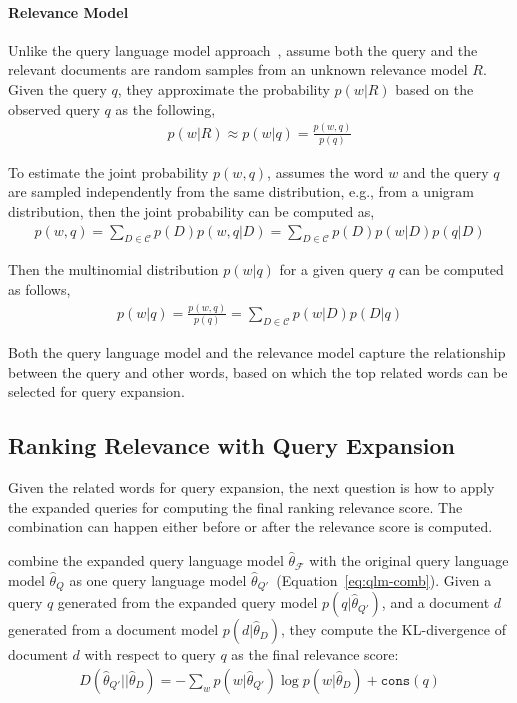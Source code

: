 \paragraph{Relevance Model}

Unlike the query language model approach~\citep{zhai-01b},
\cite{Lavrenko-2001} assume both the query and the relevant documents
are random samples from an unknown relevance model $R$. Given the
query $q$, they approximate the probability $p(w|R)$ based on the
observed query $q$ as the following,
\begin{align}
p(w|R) \approx p(w|q) = \frac{p(w,q)}{p(q)}
\end{align}

To estimate the joint probability $p(w,q)$, \cite{Lavrenko-2001}
assumes the word $w$ and the query $q$ are sampled independently from
the same distribution, e.g., from a unigram distribution, then the
joint probability can be computed as,
\begin{align}
p(w, q) = \sum_{D \in \mathcal{C}} p(D) p(w,q | D) = \sum_{D \in \mathcal{C}} p(D) p(w|D) p(q | D)
\end{align}

Then the multinomial distribution $p(w|q)$ for a given query $q$ can
be computed as follows,
\begin{align}
\label{eq:rm_qe}
p(w|q) = \frac{p(w, q)}{p(q)} = \sum_{D \in \mathcal{C}} p(w|D) p(D|q)
\end{align}

Both the query language model and the relevance model capture the
relationship between the query and other words, based on which the top
related words can be selected for query expansion.

\subsection{Ranking Relevance with Query Expansion}

Given the related words for query expansion, the next question is how
to apply the expanded queries for computing the final ranking
relevance score. The combination can happen either before or after the
relevance score is computed.

\cite{zhai-01b} combine the expanded query language model
$\hat{\theta}_{\mathcal{F}}$ with the original query language model
$\hat{\theta}_{Q}$ as one query language model $\hat{\theta}_{Q'}
$~(Equation~\ref{eq:qlm-comb}). Given a query $q$ generated from the
expanded query model $p(q|\hat{\theta}_{Q'})$, and a document $d$
generated from a document model $p(d|\hat{\theta}_D)$, they compute
the KL-divergence of document $d$ with respect to query $q$ as the
final relevance score:
\begin{align}
D(\hat{\theta}_{Q'} || \hat{\theta}_D) = -\sum_w p(w|\hat{\theta}_{Q'}) \log p(w | \hat{\theta}_D) + \texttt{cons}(q)
\end{align}

